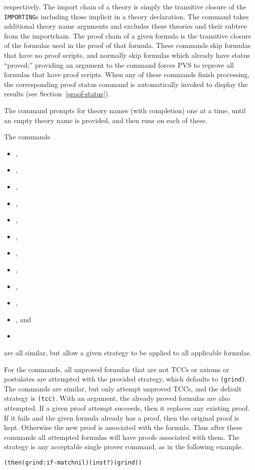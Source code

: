 respectively.  The import chain of a theory is simply the transitive
closure of the \texttt{IMPORTING}s including those implicit in a theory
declaration.  The  command takes additional
theory name arguments and excludes these theories and their subtree from
the importchain.  The proof chain of a given formula is the transitive
closure of the formulas used in the proof of that formula.  These
commands skip formulas that have no proof scripts, and normally skip
formulas which already have status ``proved;'' providing an argument to
the command forces PVS to reprove all formulas that have proof scripts.
When any of these commands finish processing, the corresponding proof
status command is automatically invoked to
display the results (see Section~\ref{proof-status}).

The  command prompts for theory names (with
completion) one at a time, until an empty theory name is provided, and
then runs  on each of these.


The commands
\begin{itemize}\setlength{\topsep}{0pt}\setlength{\parskip}{0pt}%
  \setlength{\itemsep}{0pt}\setlength{\parsep}{0pt}\renewcommand{\labelitemi}{}
\item {},
\item {},
\item {},
\item {},
\item {},
\item {},
\item {},
\item {},
\item {},
\item {},
\item {}, and
\item {}
\end{itemize}
are all similar, but allow a
given strategy to be applied to all applicable formulas.

For the  commands, all unproved formulas that are not
TCCs or axioms or postulates are attempted with the provided strategy,
which defaults to \texttt{(grind)}.  The  commands are
similar, but only attempt unproved TCCs, and the default strategy is
\texttt{(tcc)}.  With an argument, the already proved formulas are also
attempted.  If a given proof attempt succeeds, then it replaces any
existing proof.  If it fails and the given formula already has a proof,
then the original proof is kept.  Otherwise the new proof is associated
with the formula.  Thus after these commands all attempted formulas will
have proofs associated with them.  The strategy is any acceptable single
prover command, as in the following example.
\begin{alltt}
  (then (grind :if-match nil) (inst?) (grind))
\end{alltt}

